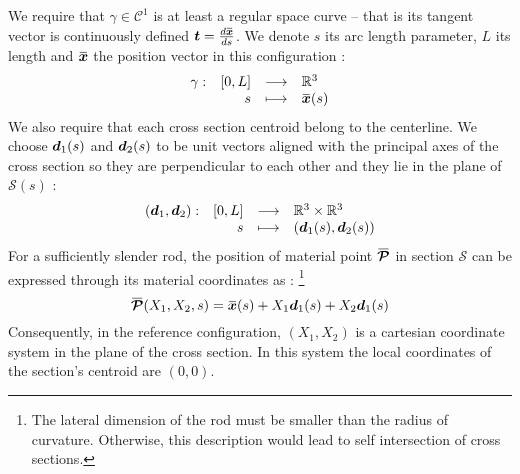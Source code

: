 We require that ${\gamma} \in \mathcal{C}^1$ is at least a regular space curve -- that is its tangent vector is continuously defined ${\vect{t}} = \frac{d \overbar{\vect{x}}}{d {s}}$. We denote ${s}$ its arc length parameter, ${L}$ its length and $\overbar{\vect{x}}$ the position vector in this configuration :
\begin{equation}
	\fonctionL{{\gamma}}{[0,{L}]}{\mathbb{R}^3}{{s}}{\overbar{\vect{x}}({s})}
\end{equation}
We also require that each cross section centroid belong to the centerline. We choose ${\boldsymbol{d}_1}({s})$ and ${\boldsymbol{d}_2}({s})$ to be  unit vectors aligned with the principal axes of the cross section so they are perpendicular to each other and they lie in the plane of $\mathcal{S}({s})$ :
\begin{equation}
	\begin{array}{lrcl} ({\boldsymbol{d}_1},{\boldsymbol{d}_2}): & [0,{L}] & \longrightarrow & \mathbb{R}^3 \times \mathbb{R}^3 \\ & {s} & \longmapsto & ({\boldsymbol{d}_1}({s}), {\boldsymbol{d}_2}({s})) \end{array}
\end{equation}
For a sufficiently slender rod, the position of material point $\overbar{\vect{\mathcal{P}}}$ in section $\mathcal{S}$ can be expressed through its material coordinates as : \footnote{The lateral dimension of the rod must be smaller than the radius of curvature. Otherwise, this description would lead to self intersection of cross sections.}
\begin{equation}
	\overbar{\vect{\mathcal{P}}}({X_1}, {X_2}, {s}) = 
	\overbar{\vect{x}}({s}) + {X_1} {\vect{d}_1}({s}) + {X_2} {\vect{d}_1}({s})
\end{equation}
Consequently, in the reference configuration, $({X_1}, {X_2})$ is a cartesian coordinate system in the plane of the cross section. In this system the local coordinates of the section's centroid are $(0,0)$.

